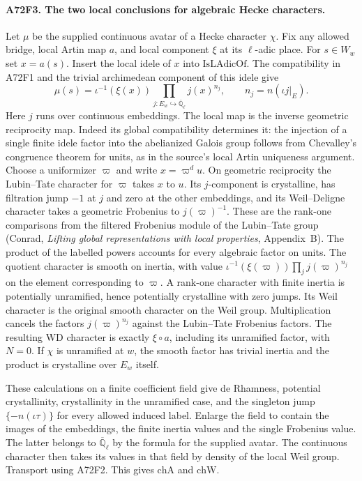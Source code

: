 \paragraph{A72F3. The two local conclusions for algebraic Hecke characters.}
Let $\mu$ be the supplied continuous avatar of a Hecke character
$\chi$. Fix any allowed bridge, local Artin map $a$, and local
component $\xi$ at its $\ell$-adic place. For $s\in W_w$ set $x=a(s)$.
Insert the local idele of $x$ into $\mathrm{IsLAdicOf}$.
The compatibility in A72F1 and the trivial archimedean component
of this idele give
\[
 \mu(s)=\iota^{-1}(\xi(x))\prod_{j: E_w\hookrightarrow
 \overline{\mathbb Q}_\ell} j(x)^{n_j},\qquad
 n_j=n(\iota j|_E).
\]
Here $j$ runs over continuous embeddings. The local map is the
inverse geometric reciprocity map. Indeed its global compatibility
determines it: the injection of a single finite idele factor into
the abelianized Galois group follows from Chevalley's congruence
theorem for units, as in the source's local Artin uniqueness
argument. Choose a uniformizer $\varpi$ and write
$x=\varpi^d u$. On geometric reciprocity the Lubin--Tate character
for $\varpi$ takes $x$ to $u$. Its $j$-component is crystalline,
has filtration jump $-1$ at $j$ and zero at the other embeddings,
and its Weil--Deligne character takes a geometric Frobenius to
$j(\varpi)^{-1}$. These are the rank-one comparisons from the
filtered Frobenius module of the Lubin--Tate group (Conrad,
\emph{Lifting global representations with local properties},
Appendix~B). The product of the labelled powers accounts for
every algebraic factor on units. The quotient character is smooth on
inertia, with value
$\iota^{-1}(\xi(\varpi))\prod_j j(\varpi)^{n_j}$
on the element corresponding to $\varpi$.
A rank-one character with finite inertia is potentially unramified,
hence potentially crystalline with zero jumps. Its Weil character
is the original smooth character on the Weil group. Multiplication
cancels the factors $j(\varpi)^{n_j}$ against the Lubin--Tate
Frobenius factors. The resulting WD character is exactly
$\xi\circ a$, including its unramified factor, with $N=0$.
If $\chi$ is unramified at $w$, the smooth factor has trivial
inertia and the product is crystalline over $E_w$ itself.

These calculations on a finite coefficient field give de Rhamness,
potential crystallinity, crystallinity in the unramified case,
and the singleton jump $\{-n(\iota\tau)\}$ for every allowed
induced label. Enlarge the field to contain the images of the
embeddings, the finite inertia values and the single Frobenius
value. The latter belongs to $\overline{\mathbb Q}_\ell$ by
the formula for the supplied avatar. The continuous character then
takes its values in that field by density of the local Weil group.
Transport using A72F2. This gives $\mathrm{chA}$ and $\mathrm{chW}$.

